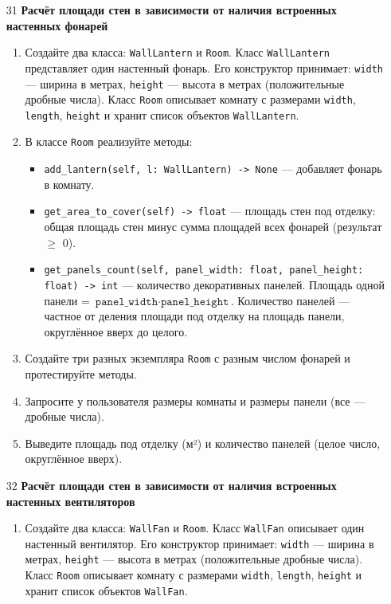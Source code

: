 \begin{enumerate}
\item[31] \textbf{Расчёт площади стен в зависимости от наличия встроенных настенных фонарей}
\begin{enumerate}
    \item Создайте два класса: \texttt{WallLantern} и \texttt{Room}.  
    Класс \texttt{WallLantern} представляет один настенный фонарь. Его конструктор принимает:  
    \texttt{width} — ширина в метрах,  
    \texttt{height} — высота в метрах (положительные дробные числа).  
    Класс \texttt{Room} описывает комнату с размерами \texttt{width}, \texttt{length}, \texttt{height} и хранит список объектов \texttt{WallLantern}.

    \item В классе \texttt{Room} реализуйте методы:  
    \begin{itemize}
        \item \texttt{add\_lantern(self, l: WallLantern) -> None} — добавляет фонарь в комнату.
        \item \texttt{get\_area\_to\_cover(self) -> float} — площадь стен под отделку: общая площадь стен минус сумма площадей всех фонарей (результат $\geqslant$ 0).
        \item \texttt{get\_panels\_count(self, panel\_width: float, panel\_height: float) -> int} — количество декоративных панелей. Площадь одной панели = \(\texttt{panel\_width} \cdot \texttt{panel\_height}\). Количество панелей — частное от деления площади под отделку на площадь панели, округлённое вверх до целого.
    \end{itemize}

    \item Создайте три разных экземпляра \texttt{Room} с разным числом фонарей и протестируйте методы.

    \item Запросите у пользователя размеры комнаты и размеры панели (все — дробные числа).

    \item Выведите площадь под отделку (м²) и количество панелей (целое число, округлённое вверх).
\end{enumerate}

\item[32] \textbf{Расчёт площади стен в зависимости от наличия встроенных настенных вентиляторов}
\begin{enumerate}
    \item Создайте два класса: \texttt{WallFan} и \texttt{Room}.  
    Класс \texttt{WallFan} описывает один настенный вентилятор. Его конструктор принимает:  
    \texttt{width} — ширина в метрах,  
    \texttt{height} — высота в метрах (положительные дробные числа).  
    Класс \texttt{Room} описывает комнату с размерами \texttt{width}, \texttt{length}, \texttt{height} и хранит список объектов \texttt{WallFan}.


\end{enumerate}
\end{enumerate}
